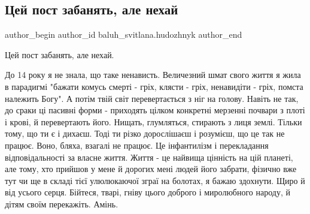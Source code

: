  
 
 
 
 

\subsection{Цей пост забанять, але нехай}
\label{sec:14_01_2023.fb.baluh_svitlana.hudozhnyk.1.tsei_post_zabanyat__}

\ifcmt
 author_begin
   author_id baluh_svitlana.hudozhnyk
 author_end
\fi

Цей пост забанять, але нехай. 

До 14 року я не знала, що таке ненависть. Величезний шмат свого життя я жила в
парадигмі "бажати комусь смерті - гріх, клясти - гріх, ненавидіти - гріх,
помста належить Богу". А потім твій світ перевертається з ніг на голову. Навіть
не так, до сраки ці пасивні форми - приходять цілком конкретні мерзенні почвари
з плоті і крові, й перевертають його. Нищать, глумляться, стирають з лиця
землі. Тільки тому, що ти є і дихаєш. Тоді ти різко дорослішаєш і розумієш, що
це так не працює. Воно, бляха, взагалі не працює. Це інфантилізм і перекладання
відповідальності за власне життя. Життя - це найвища цінність на цій планеті,
але тому, хто прийшов у мене й дорогих мені людей його забрати, фізично вже тут
чи ще в складі тієї улюлюкаючої зграї на болотах, я бажаю здохнути. Щиро й від
усього серця. Бійтеся, тварі, гніву цього доброго і миролюбного народу, й дітям
своїм перекажіть. Амінь.
